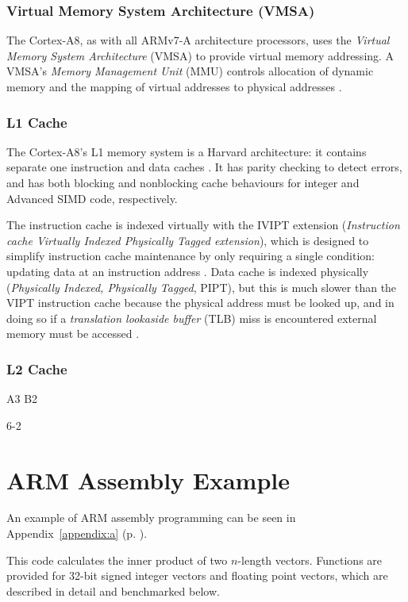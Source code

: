 \documentclass[oneside,a4paper]{report}
\begin{document}
\subsection{Virtual Memory System Architecture (VMSA)}
The Cortex-A8, as with all ARMv7-A architecture processors, uses the \emph{Virtual Memory System Architecture} (VMSA) to provide virtual memory addressing. A VMSA's \emph{Memory Management Unit} (MMU) controls allocation of dynamic memory and the mapping of virtual addresses to physical addresses \cite[p. B3-2]{ARMRef}.


\subsection{L1 Cache}

The Cortex-A8's L1 memory system is a Harvard architecture: it contains separate one instruction and data caches \cite[p. 7-2]{A8Ref}. It has parity checking to detect errors, and has both blocking and nonblocking cache behaviours for integer and Advanced SIMD code, respectively.

The instruction cache is indexed virtually with the IVIPT extension (\emph{Instruction cache Virtually Indexed Physically Tagged extension}), which is designed to simplify instruction cache maintenance by only requiring a single condition: updating data at an instruction address \cite[p. 7-4]{A8Ref}. Data cache is indexed physically (\emph{Physically Indexed, Physically Tagged}, PIPT), but this is much slower than the VIPT instruction cache because the physical address must be looked up, and in doing so if a \emph{translation lookaside buffer} (TLB) miss is encountered external memory must be accessed \cite[p. 7-8]{A8Ref}.

\subsection{L2 Cache}

A3
B2

6-2

\chapter{ARM Assembly Example}
An example of ARM assembly programming can be seen in Appendix~\ref{appendix:a} (p. \pageref{appendix:a}).

This code calculates the inner product of two $n$-length vectors. Functions are provided for 32-bit signed integer vectors and floating point vectors, which are described in detail and benchmarked below.
\end{document}
